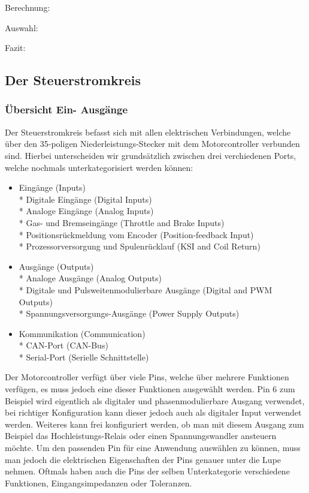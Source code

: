 Berechnung:

Auswahl:

Fazit:

\newpage



\subsection{Der Steuerstromkreis}
\subsubsection{Übersicht Ein- Ausgänge}
Der Steuerstromkreis befasst sich mit allen elektrischen Verbindungen, welche über den  35-poligen Niederleistungs-Stecker mit dem Motorcontroller verbunden sind. Hierbei unterscheiden wir grundsätzlich zwischen drei verchiedenen Ports, welche nochmals unterkategorisiert werden können:

\begin{itemize}
	\item Eingänge (Inputs)
	\\ * Digitale Eingänge (Digital Inputs)
	\\ * Analoge Eingänge (Analog Inputs)
	\\ * Gas- und Bremseingänge (Throttle and Brake Inputs)
	\\ * Positionsrückmeldung vom Encoder (Position-feedback Input)
	\\ * Prozessorversorgung und Spulenrücklauf (KSI and Coil Return)
	\item Ausgänge (Outputs)
	\\ * Analoge Ausgänge (Analog Outputs)
	\\ * Digitale und Pulsweitenmodulierbare Ausgänge (Digital and PWM Outputs)
	\\ * Spannungsversorgungs-Ausgänge (Power Supply Outputs)
	\item Kommunikation (Communication)
	\\ * CAN-Port (CAN-Bus)
	\\ * Serial-Port (Serielle Schnittstelle)
\end{itemize}

Der Motorcontroller verfügt über viele Pins, welche über mehrere Funktionen verfügen, es muss jedoch eine dieser Funktionen ausgewählt werden. Pin 6 zum Beispiel wird eigentlich als digitaler und phasenmodulierbare Ausgang verwendet, bei richtiger Konfiguration kann dieser jedoch auch als digitaler Input verwendet werden. Weiteres kann frei konfiguriert werden, ob man mit diesem Ausgang zum Beispiel das Hochleistungs-Relais oder einen Spannungswandler ansteuern möchte. Um den passenden Pin für eine Anwendung auswählen zu können, muss man jedoch die elektrischen Eigenschaften der Pins genauer unter die Lupe nehmen. Oftmals haben auch die Pins der selben Unterkategorie verschiedene Funktionen, Eingangsimpedanzen oder Toleranzen. 

